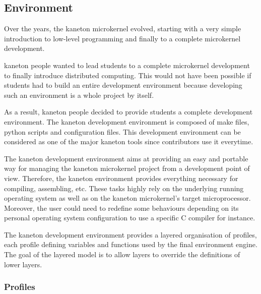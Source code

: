 %
%
%
%
%
%

%
%

\subsection{Environment}

Over the years, the kaneton microkernel evolved, starting with a very simple
introduction to low-level programming and finally to a complete microkernel
development.

kaneton people wanted to lead students to a complete microkernel development
to finally introduce distributed computing. This would not have been possible
if students had to build an entire development environment because developing
such an environment is a whole project by itself.

As a result, kaneton people decided to provide students a complete development
environment. The kaneton development environment is composed of make files,
python scripts and configuration files. This development environment can be
considered as one of the major kaneton tools since contributors use it
everytime.

The kaneton development environment aims at providing an easy and portable
way for managing the kaneton microkernel project from a development point
of view. Therefore, the kaneton environment provides everything necessary
for compiling, assembling, etc. These tasks highly rely on the underlying
running operating system as well as on the kaneton microkernel's target
microprocessor. Moreover, the user could need to redefine some behaviours
depending on its personal operating system configuration to use a specific
C compiler for instance.

The kaneton development environment provides a layered organisation of
profiles, each profile defining variables and functions used by the final
environment engine. The goal of the layered model is to allow layers to
override the definitions of lower layers.

%
%

\subsubsection{Profiles}

